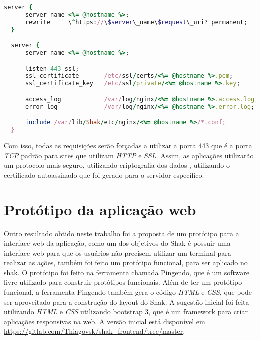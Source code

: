 \begin{lstlisting}[language=Ruby,label=dice_index,caption={Exemplo de arquivo de configuração do Nginx para aplicações web no shak}, label=codigo994]
  server {
      server_name <%= @hostname %>;
      rewrite     \^https://\$server\_name\$request\_uri? permanent;
  }

  server {
      server_name <%= @hostname %>;

      listen 443 ssl;
      ssl_certificate       /etc/ssl/certs/<%= @hostname %>.pem;
      ssl_certificate_key   /etc/ssl/private/<%= @hostname %>.key;

      access_log            /var/log/nginx/<%= @hostname %>.access.log;
      error_log             /var/log/nginx/<%= @hostname %>.error.log;

      include /var/lib/Shak/etc/nginx/<%= @hostname %>/*.conf;
  }
\end{lstlisting}

Com isso, todas as requisições serão forçadas a utilizar a porta 443 que é a porta
\textit{TCP} padrão para sites que utilizam \textit{HTTP} e \textit{SSL}. Assim, 
as aplicações utilizarão um protocolo mais seguro, utilizando criptografia dos dados
, utilizando o certificado autoassinado que foi gerado para o servidor específico.

\section{Protótipo da aplicação web}
\label{sub:prototipo}

Outro resultado obtido neste trabalho foi a proposta de um protótipo para a interface
web da aplicação, como um dos objetivos do Shak é possuir uma interface web para que
os usuários não precisem utilizar um terminal para realizar as ações, também foi
feito um protótipo funcional, para ser aplicado no shak. O protótipo foi feito
na ferramenta chamada Pingendo, que é um software livre utilizado para construir
protótipos funcionais. Além de ter um protótipo funcional, a ferramenta Pingendo
também gera o código \textit{HTML} e \textit{CSS}, que pode ser aproveitado para 
a construção do layout do Shak. A sugestão inicial foi feita utilizando \textit{HTML} e \textit{CSS} utilizando
bootstrap 3, que é um framework para criar aplicações responsivas na web. A versão
inicial está disponível em \url{https://gitlab.com/Thiagovsk/shak_frontend/tree/master}.

